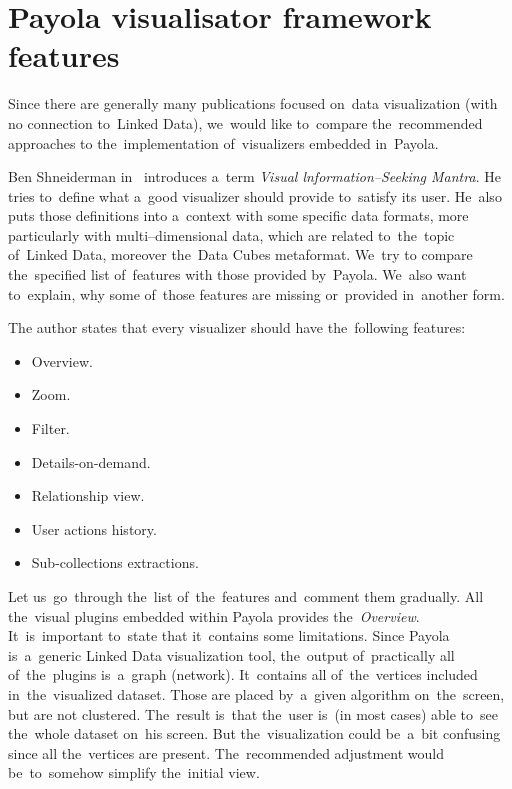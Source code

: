 \section{Payola visualisator framework features}
\label{sec:rw:mantra}
Since there are generally many publications focused on~data visualization (with no
connection to~Linked Data), we~would like to~compare the~recommended approaches to
the~implementation of~visualizers embedded in~Payola.

Ben Shneiderman in~\cite{mantra} introduces a~term \emph{Visual lnformation--Seeking Mantra}.
He tries to~define
what a~good visualizer should provide to~satisfy its user. He~also puts those definitions into
a~context with some specific data formats, more particularly with multi--dimensional data,
which are related to~the~topic of~Linked Data, moreover the~Data Cubes metaformat. We~try to
compare the~specified list of~features with those provided by~Payola. We~also want to~explain,
why some of~those features are missing or~provided in~another form.

The author states that every visualizer should have the~following features:

\begin{itemize}
\item Overview.
\item Zoom.
\item Filter.
\item Details-on-demand.
\item Relationship view.
\item User actions history.
\item Sub-collections extractions.
\end{itemize}

Let us~go~through the~list of~the~features and~comment them gradually. All the~visual plugins
embedded within Payola provides the~\emph{Overview}. It~is~important to~state
that it~contains some limitations. Since Payola is~a~generic Linked Data visualization tool,
the~output of~practically all of~the~plugins is~a~graph (network). It~contains all of~the~vertices
included in~the~visualized dataset. Those are placed by~a~given algorithm on~the~screen,
but are not clustered. The~result is~that the~user is~(in most cases) able to~see the~whole
dataset on~his screen. But the~visualization could be~a~bit confusing since all the~vertices
are present. The~recommended adjustment would be~to~somehow simplify the~initial view.

